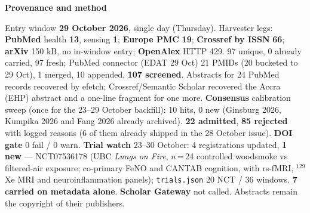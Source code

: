 \documentclass[10pt]{article}
\begin{document}


\vspace{2mm}

\begin{keybox}
{\sffamily\bfseries\footnotesize\color{Deep}Provenance and method}\\[1.2mm]
{\fontsize{7.2}{8.8}\selectfont
Entry window \textbf{29 October 2026}, single day (Thursday). Harvester legs: \textbf{PubMed} health
\textbf{13}, sensing \textbf{1}; \textbf{Europe PMC} \textbf{19}; \textbf{Crossref by ISSN} \textbf{66}; \textbf{arXiv}
150 kB, no in-window entry; \textbf{OpenAlex} HTTP 429. 97 unique, 0 already carried, 97 fresh; PubMed connector
(EDAT 29 Oct) 21 PMIDs (20 bucketed to 29 Oct), 1 merged, 10 appended, \textbf{107 screened}. Abstracts for 24
PubMed records recovered by efetch; Crossref/Semantic Scholar recovered the Accra (EHP) abstract and a one-line
fragment for one more. \textbf{Consensus} calibration sweep (once for the 23--29 October backfill): 10 hits, 0 new (Ginsburg 2026, Kumpika 2026 and Fang 2026 already archived). \textbf{22 admitted}, \textbf{85 rejected} with logged reasons (6 of them already shipped in the 28 October issue). \textbf{DOI
gate} 0 fail / 0 warn. \textbf{Trial watch} 23--30 October: 4 registrations updated, \textbf{1 new} --- NCT07536178 (UBC \emph{Lungs on Fire}, $n$\,=\,24 controlled woodsmoke vs filtered-air exposure; co-primary FeNO and CANTAB cognition, with rs-fMRI, $^{129}$Xe MRI and neuroinflammation panels); \texttt{trials.json} 20 NCT / 36 windows. \textbf{7 carried on metadata alone}. \textbf{Scholar Gateway} not called.
Abstracts remain the copyright of their publishers.\par}
\end{keybox}
\end{document}
